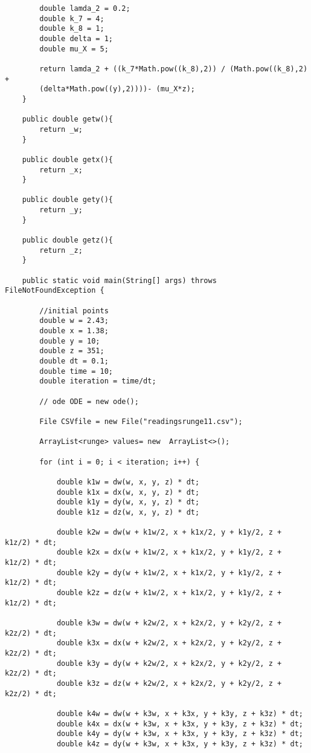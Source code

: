 \begin{framed}
\begin{verbatim}
        double lamda_2 = 0.2;
        double k_7 = 4;
        double k_8 = 1;
        double delta = 1;
        double mu_X = 5;
        
        return lamda_2 + ((k_7*Math.pow((k_8),2)) / (Math.pow((k_8),2) + 
        (delta*Math.pow((y),2))))- (mu_X*z);
    }

    public double getw(){
        return _w;
    }

    public double getx(){
        return _x;
    }
    
    public double gety(){
        return _y;
    }
    
    public double getz(){
        return _z;
    }
    
    public static void main(String[] args) throws FileNotFoundException {

        //initial points 
        double w = 2.43;
        double x = 1.38;
        double y = 10;
        double z = 351;
        double dt = 0.1; 
        double time = 10;
        double iteration = time/dt;

        // ode ODE = new ode();
        
        File CSVfile = new File("readingsrunge11.csv");

        ArrayList<runge> values= new  ArrayList<>();
       
        for (int i = 0; i < iteration; i++) {

            double k1w = dw(w, x, y, z) * dt;
            double k1x = dx(w, x, y, z) * dt;
            double k1y = dy(w, x, y, z) * dt;
            double k1z = dz(w, x, y, z) * dt;
    
            double k2w = dw(w + k1w/2, x + k1x/2, y + k1y/2, z + k1z/2) * dt;
            double k2x = dx(w + k1w/2, x + k1x/2, y + k1y/2, z + k1z/2) * dt;
            double k2y = dy(w + k1w/2, x + k1x/2, y + k1y/2, z + k1z/2) * dt;
            double k2z = dz(w + k1w/2, x + k1x/2, y + k1y/2, z + k1z/2) * dt;
    
            double k3w = dw(w + k2w/2, x + k2x/2, y + k2y/2, z + k2z/2) * dt;
            double k3x = dx(w + k2w/2, x + k2x/2, y + k2y/2, z + k2z/2) * dt;
            double k3y = dy(w + k2w/2, x + k2x/2, y + k2y/2, z + k2z/2) * dt;
            double k3z = dz(w + k2w/2, x + k2x/2, y + k2y/2, z + k2z/2) * dt;
    
            double k4w = dw(w + k3w, x + k3x, y + k3y, z + k3z) * dt;
            double k4x = dx(w + k3w, x + k3x, y + k3y, z + k3z) * dt;
            double k4y = dy(w + k3w, x + k3x, y + k3y, z + k3z) * dt;
            double k4z = dy(w + k3w, x + k3x, y + k3y, z + k3z) * dt;


\end{verbatim}
\end{framed}

